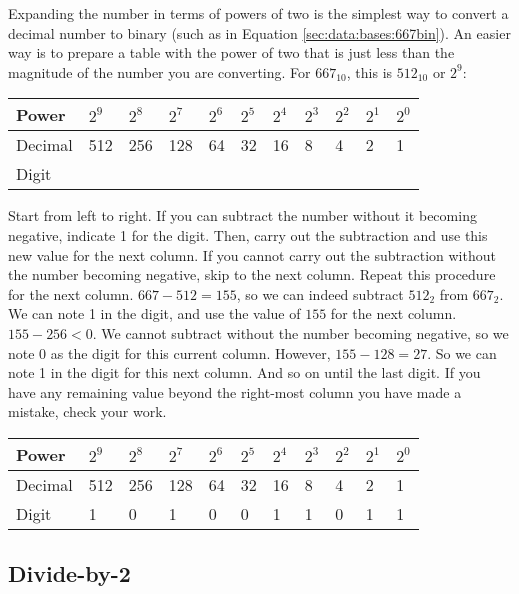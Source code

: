 Expanding the number in terms of powers of two is the simplest way to convert a decimal number %
to binary (such as in Equation \ref{sec:data:bases:667bin}). An easier way is to prepare a table with the %
power of two that is just less than the magnitude of the number you are converting. For $667_{10}$, this is %
$512_{10}$ or $2^9$:

\vspace{1em} %
\begin{tabular}{|l|l|l|l|l|l|l|l|l|l|l|}\hline
Power & $2^9$ & $2^8$ & $2^7$ & $2^6$ & $2^5$ & $2^4$ & $2^3$ & $2^2$ & $2^1$ & $2^0$ \\\hline\hline
Decimal & 512 & 256 & 128 & 64 & 32 & 16 & 8 & 4 & 2 & 1 \\\hline
Digit &  &  &  &  &  &  &  &  &  &  \\\hline
\end{tabular}
\vspace{1em}

Start from left to right. If you can subtract the number without it becoming negative, indicate 1 for the digit. %
Then, carry out the subtraction and use this new value for the next column. If you cannot carry out the subtraction %
without the number becoming negative, skip to the next column. Repeat this procedure for the next column. %
$667-512=155$, so we can indeed subtract $512_2$ from $667_2$. We can note 1 in the digit, and use the value of $155$ %
for the next column. $155-256<0$. We cannot subtract without the number becoming negative, so we note 0 as the digit %
for this current column. However, $155-128=27$. So we can note 1 in the digit for this next column. And so on until %
the last digit. If you have any remaining value beyond the right-most column you have made a mistake, check your work. %

\vspace{1em} %
\begin{tabular}{|l|l|l|l|l|l|l|l|l|l|l|}\hline
Power & $2^9$ & $2^8$ & $2^7$ & $2^6$ & $2^5$ & $2^4$ & $2^3$ & $2^2$ & $2^1$ & $2^0$ \\\hline\hline
Decimal & 512 & 256 & 128 & 64 & 32 & 16 & 8 & 4 & 2 & 1 \\\hline
Digit & 1 & 0 & 1 & 0 & 0 & 1 & 1 & 0 & 1 & 1 \\\hline
\end{tabular}
\vspace{1em}

\subsection{Divide-by-2\label{sec:numbers:divideby2}}

